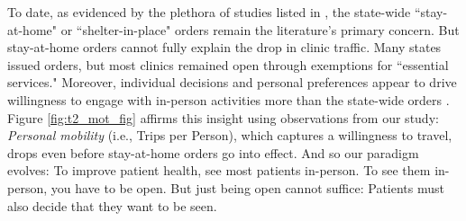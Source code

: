  To date, as evidenced by the plethora of studies listed in \cite{Gupta2020}, the state-wide “stay-at-home" or “shelter-in-place" orders remain the literature's primary concern. But stay-at-home orders cannot fully explain the drop in clinic traffic. Many states issued orders, but most clinics remained open through exemptions for “essential services." Moreover, individual decisions and personal preferences appear to drive willingness to engage with in-person activities more than the state-wide orders \citep{Goolsbee2020_key}. Figure \ref{fig:t2_mot_fig} affirms this insight using observations from our study: \textit{Personal mobility} (i.e., Trips per Person), which captures a willingness to travel, drops even before stay-at-home orders go into effect. And so our paradigm evolves: To improve patient health, see most patients in-person. To see them in-person, you have to be open. But just being open cannot suffice: Patients must also decide that they want to be seen.
 
